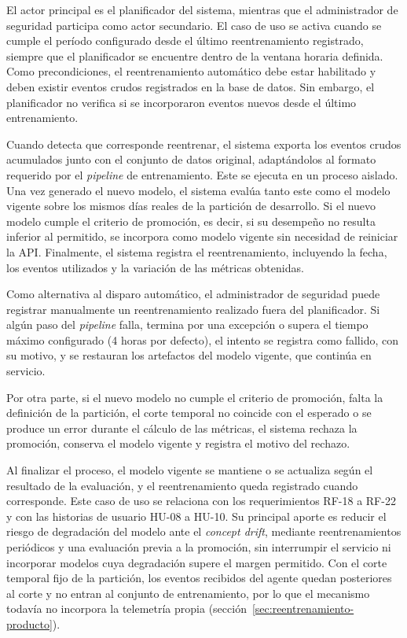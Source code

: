 El actor principal es el planificador del sistema, mientras que el administrador de seguridad participa como actor secundario. El caso de uso se activa cuando se cumple el período configurado desde el último reentrenamiento registrado, siempre que el planificador se encuentre dentro de la ventana horaria definida. Como precondiciones, el reentrenamiento automático debe estar habilitado y deben existir eventos crudos registrados en la base de datos. Sin embargo, el planificador no verifica si se incorporaron eventos nuevos desde el último entrenamiento.

Cuando detecta que corresponde reentrenar, el sistema exporta los eventos crudos acumulados junto con el conjunto de datos original, adaptándolos al formato requerido por el \emph{pipeline} de entrenamiento. Este se ejecuta en un proceso aislado. Una vez generado el nuevo modelo, el sistema evalúa tanto este como el modelo vigente sobre los mismos días reales de la partición de desarrollo. Si el nuevo modelo cumple el criterio de promoción, es decir, si su desempeño no resulta inferior al permitido, se incorpora como modelo vigente sin necesidad de reiniciar la API. Finalmente, el sistema registra el reentrenamiento, incluyendo la fecha, los eventos utilizados y la variación de las métricas obtenidas.

Como alternativa al disparo automático, el administrador de seguridad puede registrar manualmente un reentrenamiento realizado fuera del planificador. Si algún paso del \emph{pipeline} falla, termina por una excepción o supera el tiempo máximo configurado (4 horas por defecto), el intento se registra como fallido, con su motivo, y se restauran los artefactos del modelo vigente, que continúa en servicio.

Por otra parte, si el nuevo modelo no cumple el criterio de promoción, falta la definición de la partición, el corte temporal no coincide con el esperado o se produce un error durante el cálculo de las métricas, el sistema rechaza la promoción, conserva el modelo vigente y registra el motivo del rechazo.

Al finalizar el proceso, el modelo vigente se mantiene o se actualiza según el resultado de la evaluación, y el reentrenamiento queda registrado cuando corresponde. Este caso de uso se relaciona con los requerimientos RF-18 a RF-22 y con las historias de usuario HU-08 a HU-10. Su principal aporte es reducir el riesgo de degradación del modelo ante el \emph{concept drift}, mediante reentrenamientos periódicos y una evaluación previa a la promoción, sin interrumpir el servicio ni incorporar modelos cuya degradación supere el margen permitido. Con el corte temporal fijo de la partición, los eventos recibidos del agente quedan posteriores al corte y no entran al conjunto de entrenamiento, por lo que el mecanismo todavía no incorpora la telemetría propia (sección~\ref{sec:reentrenamiento-producto}).

